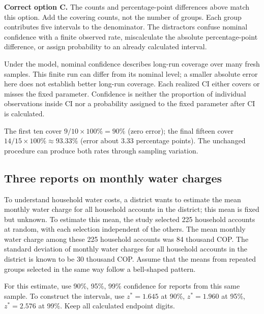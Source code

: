 \textbf{Correct option C.} The counts and percentage-point differences above match this option. Add the covering counts, not the number of groups. Each group contributes five intervals to the denominator. The distractors confuse nominal confidence with a finite observed rate, miscalculate the absolute percentage-point difference, or assign probability to an already calculated interval.

Under the model, nominal confidence describes long-run coverage over many fresh samples. This finite run can differ from its nominal level; a smaller absolute error here does not establish better long-run coverage. Each realized $\mathrm{CI}$ either covers or misses the fixed parameter. Confidence is neither the proportion of individual observations inside $\mathrm{CI}$ nor a probability assigned to the fixed parameter after $\mathrm{CI}$ is calculated.

The first ten cover $9/10\times100\%=90\%$ (zero error); the final fifteen cover $14/15\times100\%\approx93.33\%$ (error about 3.33 percentage points). The unchanged procedure can produce both rates through sampling variation.
\par\nopagebreak[4]
\par\vspace{3mm}
\clearpage
\subsection{Three reports on monthly water charges}
\label{prob:c2-advanced-d}

To understand household water costs, a district wants to estimate the mean monthly water charge for all household accounts in the district; this mean is fixed but unknown. To estimate this mean, the study selected 225 household accounts at random, with each selection independent of the others. The mean monthly water charge among these 225 household accounts was 84 thousand COP. The standard deviation of monthly water charges for all household accounts in the district is known to be 30 thousand COP. Assume that the means from repeated groups selected in the same way follow a bell-shaped pattern.

For this estimate, use 90\%, 95\%, 99\% confidence for reports from this same sample. To construct the intervals, use $z^*=1.645$ at 90\%, $z^*=1.960$ at 95\%, $z^*=2.576$ at 99\%. Keep all calculated endpoint digits.

